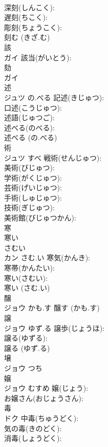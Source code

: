 \documentclass[8pt]{extreport}
\begin{document}
\begin{CJK}{UTF8}{min}
\\	深刻(しんこく): 
\\	遅刻(ちこく): 
\\	彫刻(ちょうこく): 
\\	刻む (きざ.む)
\\	該			
\\	ガイ		該当(がいとう): 
\\	劾			
\\	ガイ			
\\	述			
\\	ジュツ	の.べる	記述(きじゅつ): 
\\	口述(こうじゅつ): 
\\	述語(じゅつご): 
\\	述べる(のべる): 
\\	述べる (の.べる)
\\	術			
\\	ジュツ	すべ	戦術(せんじゅつ): 
\\	美術(びじゅつ): 
\\	学術(がくじゅつ): 
\\	芸術(げいじゅつ): 
\\	手術(しゅじゅつ): 
\\	技術(ぎじゅつ): 
\\	美術館(びじゅつかん): 
\\	寒			
\\	寒い　
\\	さむい　
\\	カン	さむ.い	寒気(かんき): 
\\	寒帯(かんたい): 
\\	寒い(さむい): 
\\	寒い (さむ.い)
\\	醸			
\\	ジョウ	かも.す		醸す (かも.す)
\\	譲			
\\	ジョウ	ゆず.る	譲歩(じょうほ): 
\\	譲る(ゆずる): 
\\	譲る (ゆず.る)
\\	壌			
\\	ジョウ	つち		
\\	嬢			
\\	ジョウ	むすめ	嬢(じょう): 
\\	お嬢さん(おじょうさん): 
\\	毒			
\\	ドク		中毒(ちゅうどく): 
\\	気の毒(きのどく): 
\\	消毒(しょうどく): 

\end{CJK}
\end{document}
